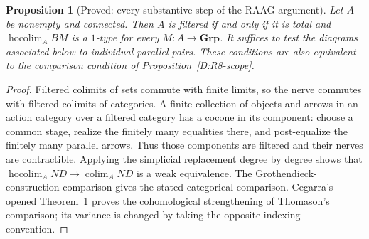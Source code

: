 \documentclass[11pt,a4paper]{article}
\newcommand{\Grp}{\mathbf{Grp}}
\newcommand{\colim}{\operatorname*{colim}}
\newcommand{\hocolim}{\operatorname*{hocolim}}
\newtheorem{proposition}[theorem]{Proposition}
\theoremstyle{definition}
\begin{document}
\begin{proposition}[Proved: every substantive step of the RAAG argument]\label{D:RAAG}
Let $A$ be nonempty and connected. Then $A$ is filtered if and only
if it is total and $\hocolim_A BM$ is a $1$-type for every
$M:A\to\Grp$. It suffices to test the diagrams associated below
to individual parallel pairs. These conditions are also equivalent
to the comparison condition of Proposition~\ref{D:R8-scope}.
\end{proposition}
\begin{proof}
Filtered colimits of sets commute with finite limits, so the nerve
commutes with filtered colimits of categories. A finite collection
of objects and arrows in an action category over a filtered category
has a cocone in its component: choose a common stage, realize the
finitely many equalities there, and post-equalize the finitely many
parallel arrows. Thus those components are filtered and their
nerves are contractible. Applying the simplicial replacement degree
by degree shows that $\hocolim_A ND\to\colim_A ND$ is a weak
equivalence. The Grothendieck-construction comparison gives the
stated categorical comparison. Cegarra's opened Theorem~1 \citep{Cegarra2020} proves
the cohomological strengthening of Thomason's comparison; its
variance is changed by taking the opposite indexing convention.


\end{proof}
\end{document}

